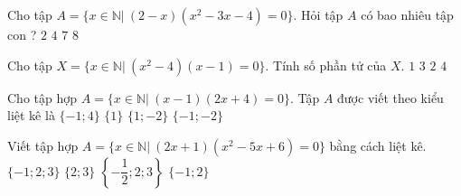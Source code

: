 \begin{ex}%
	Cho tập $A=\{ x\in \mathbb{N}|~(2-x)(x^2-3x-4)=0  \}$. Hỏi tập $A$ có bao nhiêu tập con ?
	\choice 
		 {$2$}
		{\True  $4$}
		{$7$} 
		 {$8$}
\end{ex}

\begin{ex}%
	 Cho tập $X=\{ x \in \mathbb{N} |~ (x^2-4)(x-1)=0\}$. Tính số phần tử của $X$.
	 \choice
		 {$1$}
		{$3$} 
		 {\True $2$}
		 {$4$}
\end{ex}

\begin{ex}%
	Cho tập hợp  $A=\{ x \in \mathbb{N} |~(x-1)(2x+4)=0 \}$. Tập $A$ được viết theo kiểu liệt kê là
	 \choice
		 {$\{ -1;4 \}$}
		{\True $\{  1 \}$}
		{$\{ 1;-2 \}$} 
		 {$\{ -1;-2 \}$}
\end{ex}

\begin{ex}%
	Viết tập hợp $A=\{ x \in \mathbb{N} |~ (2x+1)(x^2-5x+6)=0\}$ bằng  cách liệt kê.
	\choice 
		{$\{ -1;2;3  \}$}
		{\True $\{  2;3 \}$}
		 {$\left\{ -\dfrac{1}{2};2;3 \right\}$}
		{$\{ -1;2 \}$} 
\end{ex}

